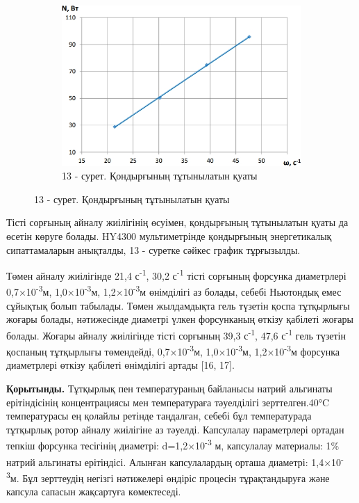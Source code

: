\begin{figure}[H]
	\centering
	\begin{subfigure}{0.48\textwidth}
		\centering
		\includegraphics[width=\textwidth]{media/pish/image46}
		\caption*{13 - сурет. Қондырғының тұтынылатын қуаты}
	\end{subfigure}
\end{figure}

\begin{multicols}{2}
Тісті сорғының айналу жиілігінің өсуімен, қондырғының тұтынылатын қуаты
да өсетін көруге болады. HY4300 мультиметрінде қондырғының энергетикалық
сипаттамаларын анықталды, 13 - суретке сәйкес график тұрғызылды.

Төмен айналу жиілігінде 21,4 с\textsuperscript{-1}, 30,2
с\textsuperscript{-1} тісті сорғының форсунка диаметрлері
0,7×10\textsuperscript{-3}м, 1,0×10\textsuperscript{-3}м,
1,2×10\textsuperscript{-3}м өнімділігі аз болады, себебі Ньютондық емес
сұйықтық болып табылады. Төмен жылдамдықта гель түзетін қоспа тұтқырлығы
жоғары болады, нәтижесінде диаметрі үлкен форсунканың өткізу қабілеті
жоғары болады. Жоғары айналу жиілігінде тісті сорғының 39,3
с\textsuperscript{-1}, 47,6 с\textsuperscript{-1} гель түзетін қоспаның
тұтқырлығы төмендейді, 0,7×10\textsuperscript{-3}м,
1,0×10\textsuperscript{-3}м, 1,2×10\textsuperscript{-3}м форсунка
диаметрлері өткізу қабілеті өнімділігі артады {[}16, 17{]}.

{\bfseries Қорытынды.} Тұтқырлық пен температураның байланысы натрий
альгинаты ерітіндісінің концентрациясы мен температураға тәуелділігі
зерттелген.40°C температурасы ең қолайлы ретінде таңдалған, себебі бұл
температурада тұтқырлық ротор айналу жиілігіне аз тәуелді. Капсулалау
параметрлері ортадан тепкіш форсунка тесігінің диаметрі:
d=1,2×10\textsuperscript{-3} м, капсулалау материалы: 1\% натрий
альгинаты ерітіндісі. Алынған капсулалардың орташа диаметрі:
1,4×10\textsuperscript{-3}м. Бұл зерттеудің негізгі нәтижелері өндіріс
процесін тұрақтандыруға және капсула сапасын жақсартуға көмектеседі.
\end{multicols}

